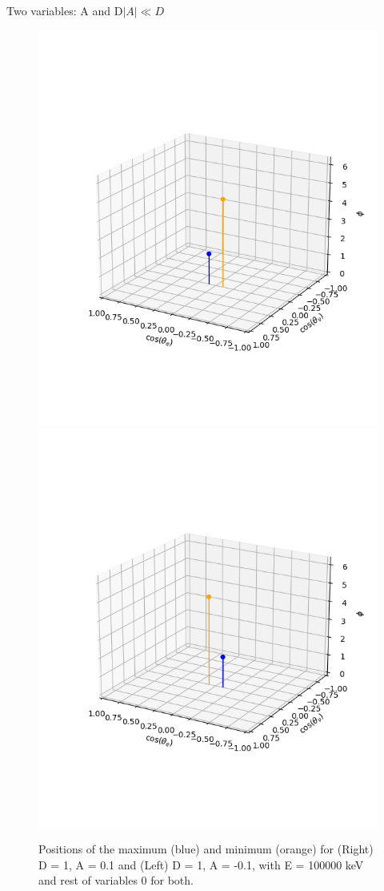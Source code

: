 \documentclass{beamer}
\begin{document}
\begin{frame}{Two variables: A and D}{$|A|\ll D$}
	\begin{figure}
		\centering
		\includegraphics[width=0.4\paperwidth]{plots/posD_xsposA_max_min}
		\includegraphics[width=0.4\paperwidth]{plots/posD_xsnegA_max_min}
		\caption{Positions of the maximum (blue) and minimum (orange) for (Right) D = 1, A = 0.1 and (Left) D = 1, A = -0.1, with E = 100000 keV and rest of variables 0 for both.}
	\end{figure}
\end{frame}
\end{document}
